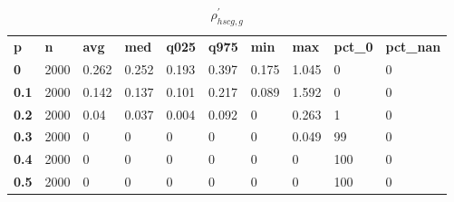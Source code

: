 \begin{table}[h]
 \centering 
\footnotesize
\caption{$\rho_{hscg,g}^\prime $}
\label{tab:alphahscgg}
\begin{tabular}[h]{| l l l l l l l l l l|
    } \hline
\textbf{ p} & \textbf{ n} & \textbf{ avg} & \textbf{ med} & \textbf{ q025} & \textbf{ q975} & \textbf{ min} & \textbf{ max} & \textbf{ pct\_0} & \textbf{ pct\_nan}
           \\
  \textbf{  0} & 2000 & 0.262 & 0.252 & 0.193 & 0.397 & 0.175 & 1.045 &   0 & 0
           \\
  \textbf{0.1} & 2000 & 0.142 & 0.137 & 0.101 & 0.217 & 0.089 & 1.592 &   0 & 0
           \\
  \textbf{0.2} & 2000 &  0.04 & 0.037 & 0.004 & 0.092 &     0 & 0.263 &   1 & 0
           \\
  \textbf{0.3} & 2000 &     0 &     0 &     0 &     0 &     0 & 0.049 &  99 & 0
           \\
  \textbf{0.4} & 2000 &     0 &     0 &     0 &     0 &     0 &     0 & 100 & 0
           \\
  \textbf{0.5} & 2000 &     0 &     0 &     0 &     0 &     0 &     0 & 100 & 0
           \\
 \hline \end{tabular}
 \end{table}
